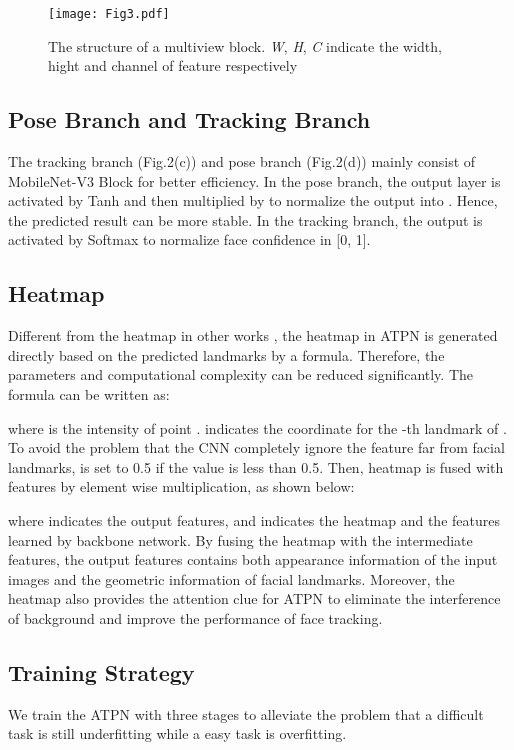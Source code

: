 \documentclass[3p,twocolumn, round, sort & compress]{elsarticle}
\begin{document}
\begin{figure}[t!]
	\centering
	\texttt{[image: Fig3.pdf]}
	\caption{The structure of a multiview block. \emph{W}, \emph{H}, \emph{C} indicate the width, hight and channel of feature respectively}
	\label{fig3}
\end{figure}

\subsection{Pose Branch and Tracking Branch}
The tracking branch (Fig.2(c)) and pose branch (Fig.2(d)) mainly consist of MobileNet-V3 Block for better efficiency. In the pose branch, the output layer is activated by Tanh and then multiplied by  to normalize the output  into . Hence, the predicted result can be more stable. In the tracking branch, the output is activated by Softmax to normalize face confidence  in [0, 1].

\subsection{Heatmap}
Different from the heatmap in other works \citep{LAB, DeCaFA, PropNet}, the heatmap in ATPN is generated directly based on the predicted landmarks by a formula. Therefore, the parameters and computational complexity can be reduced significantly. The formula can be written as:

where  is the intensity of point .  indicates the coordinate for the -th landmark of . To avoid the problem that the CNN completely ignore the feature far from facial landmarks,  is set to 0.5 if the value is less than 0.5. Then, heatmap is fused with features by element wise multiplication, as shown below:

where  indicates the output features,  and  indicates the heatmap and the features learned by backbone network. By fusing the heatmap with the intermediate features, the output features contains both appearance information of the input images and the geometric information of facial landmarks. Moreover, the heatmap also provides the attention clue for ATPN to eliminate the interference of background and improve the performance of face tracking.



\subsection{Training Strategy}
We train the ATPN with three stages to alleviate the problem that a difficult task is still underfitting while a easy task is overfitting. 
\end{document}
